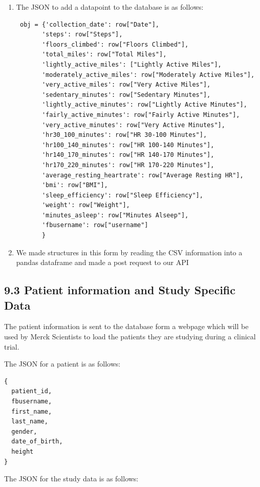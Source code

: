 \documentclass[]{book}
\begin{document}
\begin{enumerate}
\def\labelenumi{\arabic{enumi}.}
\item
  The JSON to add a datapoint to the database is as follows:

\begin{verbatim}
 obj = {'collection_date': row["Date"],
       'steps': row["Steps"],
       'floors_climbed': row["Floors Climbed"],
       'total_miles': row["Total Miles"],
       'lightly_active_miles': ["Lightly Active Miles"],
       'moderately_active_miles': row["Moderately Active Miles"],
       'very_active_miles': row["Very Active Miles"],
       'sedentary_minutes': row["Sedentary Minutes"],
       'lightly_active_minutes': row["Lightly Active Minutes"],
       'fairly_active_minutes': row["Fairly Active Minutes"],
       'very_active_minutes': row["Very Active Minutes"],
       'hr30_100_minutes': row["HR 30-100 Minutes"],
       'hr100_140_minutes': row["HR 100-140 Minutes"],
       'hr140_170_minutes': row["HR 140-170 Minutes"],
       'hr170_220_minutes': row["HR 170-220 Minutes"],
       'average_resting_heartrate': row["Average Resting HR"],
       'bmi': row["BMI"],
       'sleep_efficiency': row["Sleep Efficiency"],
       'weight': row["Weight"],
       'minutes_asleep': row["Minutes Alseep"],
       'fbusername': row["username"]
       }
\end{verbatim}
\item
  We made structures in this form by reading the CSV information into a
  pandas dataframe and made a post request to our API
\end{enumerate}

\subsection{9.3 Patient information and Study Specific
Data}\label{patient-information-and-study-specific-data-1}

The patient information is sent to the database form a webpage which
will be used by Merck Scientists to load the patients they are studying
during a clinical trial.

The JSON for a patient is as follows:

\begin{verbatim}
{
  patient_id,
  fbusername,
  first_name,
  last_name,
  gender,
  date_of_birth,
  height
}
\end{verbatim}

The JSON for the study data is as follows:
\end{document}
